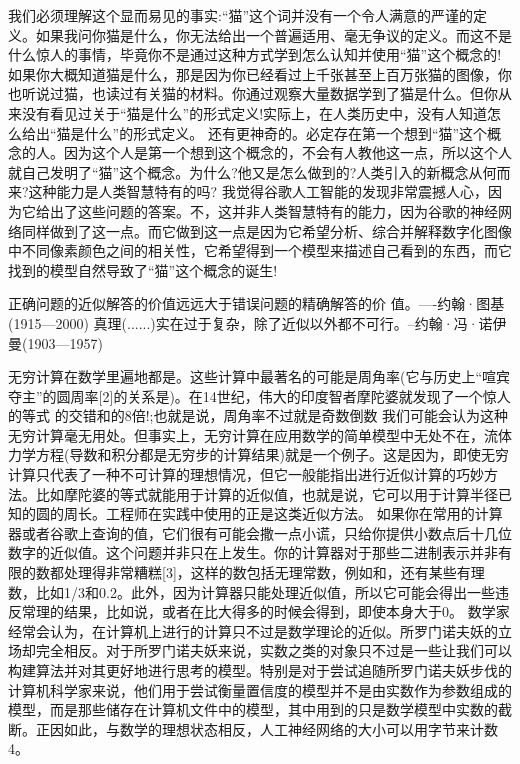 我们必须理解这个显而易见的事实:“猫”这个词并没有一个令人满意的严谨的定义。如果我问你猫是什么，你无法给出一个普遍适用、毫无争议的定义。而这不是什么惊人的事情，毕竟你不是通过这种方式学到怎么认知并使用“猫”这个概念的!如果你大概知道猫是什么，那是因为你已经看过上千张甚至上百万张猫的图像，你也听说过猫，也读过有关猫的材料。你通过观察大量数据学到了猫是什么。但你从来没有看见过关于“猫是什么”的形式定义!实际上，在人类历史中，没有人知道怎么给出“猫是什么”的形式定义。
还有更神奇的。必定存在第一个想到“猫”这个概念的人。因为这个人是第一个想到这个概念的，不会有人教他这一点，所以这个人就自己发明了“猫”这个概念。为什么?他又是怎么做到的?人类引入的新概念从何而来?这种能力是人类智慧特有的吗?
我觉得谷歌人工智能的发现非常震撼人心，因为它给出了这些问题的答案。不，这并非人类智慧特有的能力，因为谷歌的神经网络同样做到了这一点。而它做到这一点是因为它希望分析、综合并解释数字化图像中不同像素颜色之间的相关性，它希望得到一个模型来描述自己看到的东西，而它找到的模型自然导致了“猫”这个概念的诞生!


正确问题的近似解答的价值远远大于错误问题的精确解答的价
值。----约翰·图基(1915—2000)
真理(......)实在过于复杂，除了近似以外都不可行。--约翰·冯·诺伊曼(1903—1957)

无穷计算在数学里遍地都是。这些计算中最著名的可能是周角率(它与历史上“喧宾夺主”的圆周率[2]的关系是)。在14世纪，伟大的印度智者摩陀婆就发现了一个惊人的等式
的交错和的8倍!;也就是说，周角率不过就是奇数倒数
我们可能会认为这种无穷计算毫无用处。但事实上，无穷计算在应用数学的简单模型中无处不在，流体力学方程(导数和积分都是无穷步的计算结果)就是一个例子。这是因为，即使无穷计算只代表了一种不可计算的理想情况，但它一般能指出进行近似计算的巧妙方法。比如摩陀婆的等式就能用于计算的近似值，也就是说，它可以用于计算半径已知的圆的周长。工程师在实践中使用的正是这类近似方法。
如果你在常用的计算器或者谷歌上查询的值，它们很有可能会撒一点小谎，只给你提供小数点后十几位数字的近似值。这个问题并非只在上发生。你的计算器对于那些二进制表示并非有限的数都处理得非常糟糕[3]，这样的数包括无理常数，例如和，还有某些有理数，比如1/3和0.2。此外，因为计算器只能处理近似值，所以它可能会得出一些违反常理的结果，比如说，或者在比大得多的时候会得到，即使本身大于0。
数学家经常会认为，在计算机上进行的计算只不过是数学理论的近似。所罗门诺夫妖的立场却完全相反。对于所罗门诺夫妖来说，实数之类的对象只不过是一些让我们可以构建算法并对其更好地进行思考的模型。特别是对于尝试追随所罗门诺夫妖步伐的计算机科学家来说，他们用于尝试衡量置信度的模型并不是由实数作为参数组成的模型，而是那些储存在计算机文件中的模型，其中用到的只是数学模型中实数的截断。正因如此，与数学的理想状态相反，人工神经网络的大小可以用字节来计数4。

